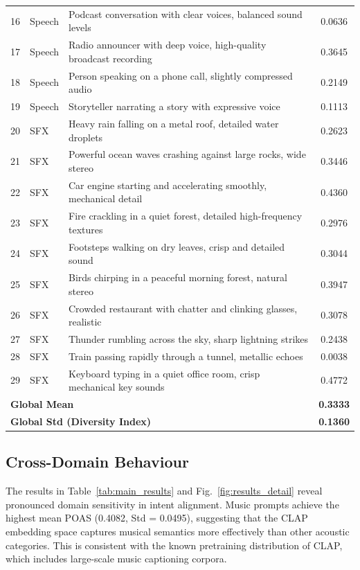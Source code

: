 \documentclass[journal]{IEEEtran}
\begin{document}
\begin{table}[!t]
\begin{tabular}{|c|l|l|c|}
  16 & Speech & Podcast conversation with clear voices, balanced sound levels          & 0.0636 \\
  17 & Speech & Radio announcer with deep voice, high-quality broadcast recording      & 0.3645 \\
  18 & Speech & Person speaking on a phone call, slightly compressed audio             & 0.2149 \\
  19 & Speech & Storyteller narrating a story with expressive voice                    & 0.1113 \\
  \hline
  20 & SFX    & Heavy rain falling on a metal roof, detailed water droplets            & 0.2623 \\
  21 & SFX    & Powerful ocean waves crashing against large rocks, wide stereo         & 0.3446 \\
  22 & SFX    & Car engine starting and accelerating smoothly, mechanical detail       & 0.4360 \\
  23 & SFX    & Fire crackling in a quiet forest, detailed high-frequency textures     & 0.2976 \\
  24 & SFX    & Footsteps walking on dry leaves, crisp and detailed sound              & 0.3044 \\
  25 & SFX    & Birds chirping in a peaceful morning forest, natural stereo            & 0.3947 \\
  26 & SFX    & Crowded restaurant with chatter and clinking glasses, realistic        & 0.3078 \\
  27 & SFX    & Thunder rumbling across the sky, sharp lightning strikes               & 0.2438 \\
  28 & SFX    & Train passing rapidly through a tunnel, metallic echoes               & 0.0038 \\
  29 & SFX    & Keyboard typing in a quiet office room, crisp mechanical key sounds   & 0.4772 \\
  \hline
  \multicolumn{3}{|l|}{\textbf{Global Mean}} & \textbf{0.3333} \\
  \multicolumn{3}{|l|}{\textbf{Global Std (Diversity Index)}} & \textbf{0.1360} \\
  \hline
  \end{tabular}
\end{table}

\subsection{Cross-Domain Behaviour}

The results in Table~\ref{tab:main_results} and
Fig.~\ref{fig:results_detail} reveal pronounced domain sensitivity in
intent alignment. Music prompts achieve the highest mean POAS
(0.4082, Std = 0.0495), suggesting that the CLAP embedding space
captures musical semantics more effectively than other acoustic
categories. This is consistent with the known pretraining distribution
of CLAP, which includes large-scale music captioning corpora.
\end{document}

